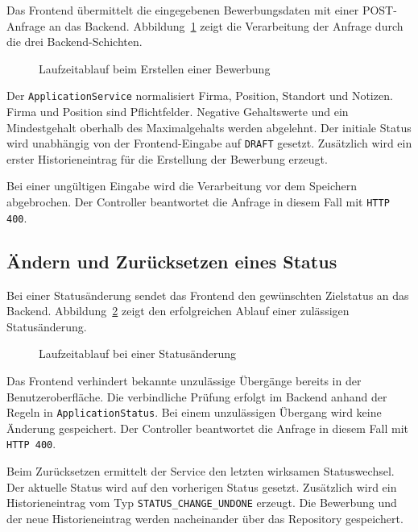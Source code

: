 \documentclass[a4paper,11pt]{article}
\begin{document}
Das Frontend übermittelt die eingegebenen Bewerbungsdaten mit einer POST-Anfrage an das Backend.
Abbildung~\ref{fig:runtime-create} zeigt die Verarbeitung der Anfrage durch die drei Backend-Schichten.

\vspace{0.4cm}

\begin{figure}[H]
\centering
\resizebox{\textwidth}{!}{
  
}
\caption{Laufzeitablauf beim Erstellen einer Bewerbung}
\label{fig:runtime-create}
\end{figure}

Der \texttt{ApplicationService} normalisiert Firma, Position, Standort und Notizen.
Firma und Position sind Pflichtfelder.
Negative Gehaltswerte und ein Mindestgehalt oberhalb des Maximalgehalts werden abgelehnt.
Der initiale Status wird unabhängig von der Frontend-Eingabe auf \texttt{DRAFT} gesetzt.
Zusätzlich wird ein erster Historieneintrag für die Erstellung der Bewerbung erzeugt.

Bei einer ungültigen Eingabe wird die Verarbeitung vor dem Speichern abgebrochen.
Der Controller beantwortet die Anfrage in diesem Fall mit \texttt{HTTP 400}.


\newpage
\subsection{Ändern und Zurücksetzen eines Status}

Bei einer Statusänderung sendet das Frontend den gewünschten Zielstatus an das Backend.
Abbildung~\ref{fig:runtime-status} zeigt den erfolgreichen Ablauf einer zulässigen Statusänderung.

\vspace{0.4cm}

\begin{figure}[H]
\centering
\resizebox{\textwidth}{!}{
  
}
\caption{Laufzeitablauf bei einer Statusänderung}
\label{fig:runtime-status}
\end{figure}

Das Frontend verhindert bekannte unzulässige Übergänge bereits in der Benutzeroberfläche.
Die verbindliche Prüfung erfolgt im Backend anhand der Regeln in \texttt{ApplicationStatus}.
Bei einem unzulässigen Übergang wird keine Änderung gespeichert.
Der Controller beantwortet die Anfrage in diesem Fall mit \texttt{HTTP 400}.

Beim Zurücksetzen ermittelt der Service den letzten wirksamen Statuswechsel.
Der aktuelle Status wird auf den vorherigen Status gesetzt.
Zusätzlich wird ein Historieneintrag vom Typ \texttt{STATUS\_CHANGE\_UNDONE} erzeugt.
Die Bewerbung und der neue Historieneintrag werden nacheinander über das Repository gespeichert.
\end{document}
